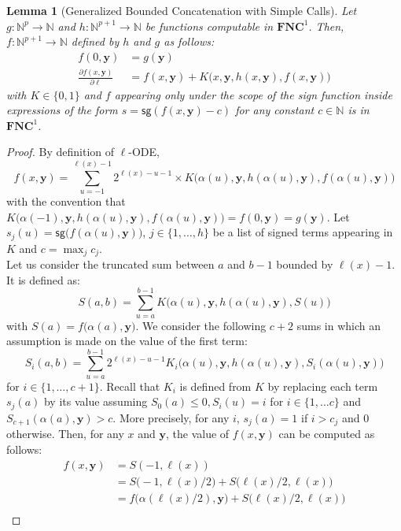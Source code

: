 \documentclass[11pt, oneside]{article}
\newcommand{\fun}[1]{\mathsf{#1}}
\newcommand{\Nat}{\mathbb{N}}
\newcommand{\NC}{\mathbf{FNC}}
\newcommand{\tu}[1]{\mathbf{#1}}
\newtheorem{lemma}{Lemma}
\theoremstyle{definition}
\begin{document}
\begin{toappendix}
\begin{lemma}[Generalized Bounded Concatenation with Simple Calls]\label{lemma:gBC}
    Let $g:\Nat^p\to \Nat$ and $h:\Nat^{p+1}\to \Nat$ be functions computable in $\NC^1$.
    Then, $f:\Nat^{p+1}\to \Nat$ defined by $h$ and $g$ as follows:
    \begin{align*}
        f(0, \tu y) &= g(\tu y) \\
        \frac{\partial f(x, \tu y)}{\partial \ell} &= f(x, \tu y) + K\big(x, \tu y, h(x, \tu y), f(x, \tu y)\big)
    \end{align*}
    with $K\in \{0,1\}$ and $f$ appearing only under the scope of the sign function inside expressions of the form $s=\fun{sg}(f(x,\tu y) - c)$ for any constant $c\in \Nat$ is in $\NC^1$.
\end{lemma}
\begin{proof}
    By definition of $\ell$-ODE,
    $$
    f(x, \tu y) = \sum^{\ell(x)-1}_{u=-1} 2^{\ell(x)-u-1} \times K\big(\alpha(u), \tu y, h(\alpha(u), \tu y), f(\alpha(u), \tu y)\big)
    $$
    with the convention that $K\big(\alpha(-1), \tu y, h(\alpha(u), \tu y), f(\alpha(u), \tu y)\big)= f(0, \tu y)=g(\tu y)$.
    Let $s_j(u)=\fun{sg}\big(f(\alpha(u), \tu y)\big)$, $j\in \{1, \dots, h\}$ be a list of signed terms appearing in $K$ and $c=\max_jc_j$.
    \\
    Let us consider the truncated sum between $a$ and $b-1$ bounded by $\ell(x)-1$.
    It is defined as:
    $$
    S(a,b) = \sum^{b-1}_{u=a} K\big(\alpha(u), \tu y, h(\alpha(u), \tu y), S(u)\big)
    $$
    with $S(a)=f\big(\alpha(a), \tu y\big)$.
    We consider the following $c+2$ sums in which an assumption is made on the value of the first term:
    $$
    S_i(a,b) = \sum^{b-1}_{u=a} 2^{\ell(x)-u-1}K_i\big(\alpha(u), \tu y, h(\alpha(u), \tu y), S_i(\alpha(u), \tu y)\big)
    $$
    for $i\in \{1,\dots, c+1\}$.
    Recall that $K_i$ is defined from $K$ by replacing each term $s_j(a)$ by its value assuming $S_0(a)\leq 0, S_i(u)=i$ for $i\in \{1,\dots c\}$ and $S_{c+1}(\alpha(a), \tu y)>c$.
    More precisely, for any $i$, $s_j(a)=1$ if $i>c_j$ and 0 otherwise.
    Then, for any $x$ and $\tu y$, the value of $f(x, \tu y)$ can be computed as follows:
    \begin{align*}
        f(x, \tu y) &= S(-1, \ell(x)) \\
        &= S\big(-1, \ell(x)/2\big) + S\big(\ell(x)/2, \ell(x)\big) \\
        &= f\big(\alpha(\ell(x)/2), \tu y\big) + S\big(\ell(x)/2, \ell(x)\big) \\

\end{align*}
\end{proof}
\end{toappendix}
\end{document}
